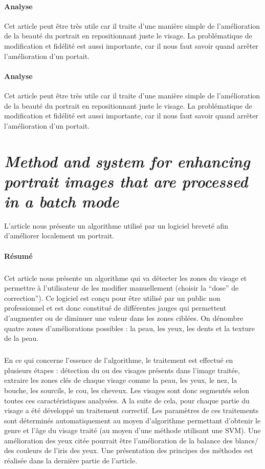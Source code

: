 \documentclass[11pt, french,screen]{report-rd-info}
\begin{document}
\paragraph{Analyse}
Cet article peut être très utile car il traite d'une manière simple de l'amélioration de la beauté du portrait en repositionnant juste le visage. La problématique de modification et fidélité est aussi importante, car il nous faut savoir quand arrêter l'amélioration d'un portait.
\paragraph{Analyse}
Cet article peut être très utile car il traite d'une manière simple de l'amélioration de la beauté du portrait en repositionnant juste le visage. La problématique de modification et fidélité est aussi importante, car il nous faut savoir quand arrêter l'amélioration d'un portait.
\section{\emph{Method and system for enhancing portrait images that are processed in a batch mode}}
L'article \cite{Matraszek2004} nous présente un algorithme utilisé par un logiciel breveté afin d'améliorer localement un portrait.
\paragraph{Résumé}
\subparagraph{}
Cet article nous présente un algorithme qui va détecter les zones du visage et permettre à l'utilisateur de les modifier manuellement (choisir la “dose” de correction”). Ce logiciel est conçu pour être utilisé par un public non professionnel et est donc constitué de différentes jauges qui permettent d'augmenter ou de diminuer une valeur dans les zones ciblées. On dénombre quatre zones d'améliorations possibles : la peau, les yeux, les dents et la texture de la peau.
\subparagraph{}
En ce qui concerne l’essence de l’algorithme, le traitement est effectué en plusieurs étapes : détection du ou des visages présents dans l’image traitée, extraire les zones clés de chaque visage comme la peau, les yeux, le nez, la bouche, les sourcils, le cou, les cheveux. Les visages sont donc segmentés selon toutes ces caractéristiques analysées. A la suite de cela, pour chaque partie du visage a été développé un traitement correctif. Les paramètres de ces traitements sont déterminés automatiquement au moyen d’algorithme permettant d’obtenir le genre et l’âge du visage traité (au moyen d’une méthode utilisant une SVM).
Une amélioration des yeux citée pourrait être l’amélioration de la balance des blancs/ des couleurs de l’iris des yeux. Une présentation des principes des méthodes est réalisée dans la dernière partie de l’article.
\end{document}
